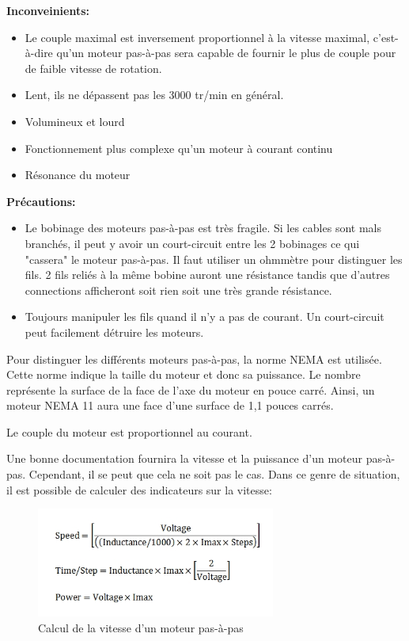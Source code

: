 \documentclass[a4paper, 11pt]{report}
\begin{document}
\textbf{Inconveinients:}
\begin{itemize}
\item Le couple maximal est inversement proportionnel à la vitesse maximal, c'est-à-dire qu'un moteur pas-à-pas sera capable de fournir le plus de couple pour de faible vitesse de rotation.
\item Lent, ils ne dépassent pas les 3000 tr/min en général.
\item Volumineux et lourd
\item Fonctionnement plus complexe qu'un moteur à courant continu
\item Résonance du moteur
\end{itemize}

\textbf{Précautions:}
\begin{itemize}
\item Le bobinage des moteurs pas-à-pas est très fragile. Si les cables sont mals branchés, il peut y avoir un court-circuit entre les 2 bobinages ce qui "cassera" le moteur pas-à-pas. Il faut utiliser un ohmmètre pour distinguer les fils. 2 fils reliés à la même bobine auront une résistance tandis que d'autres connections afficheront soit rien soit une très grande résistance.
\item Toujours manipuler les fils quand il n'y a pas de courant. Un court-circuit peut facilement détruire les moteurs.
\end{itemize}

Pour distinguer les différents moteurs pas-à-pas, la norme NEMA est utilisée. Cette norme indique la taille du moteur et donc sa puissance. Le nombre représente la surface de la face de l'axe du moteur en pouce carré. Ainsi, un moteur NEMA 11 aura une face d'une surface de 1,1 pouces carrés.

Le couple du moteur est proportionnel au courant.

Une bonne documentation fournira la vitesse et la puissance d'un moteur pas-à-pas. Cependant, il se peut que cela ne soit pas le cas. Dans ce genre de situation, il est possible de calculer des indicateurs sur la vitesse:

\begin{figure}[h]
\caption{Calcul de la vitesse d'un moteur pas-à-pas}

\begin{centering}
\includegraphics[width=0.7\textwidth]{images/SpeedCalculator.jpeg}
\par\end{centering}
\end{figure}
\end{document}
